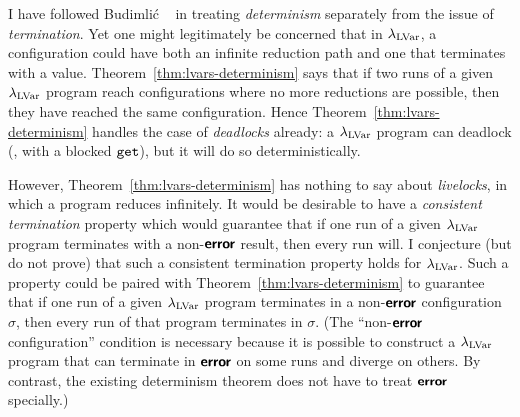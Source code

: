 I have followed Budimli\'c \etal~\cite{CnC} in treating
\emph{determinism} separately from the issue of \emph{termination}.
Yet one might legitimately be concerned that in $\lambda_{\textrm{LVar}}$, a
configuration could have both an infinite reduction path and one that
terminates with a value.  Theorem~\ref{thm:lvars-determinism} says
that if two runs of a given $\lambda_{\textrm{LVar}}$ program reach configurations
where no more reductions are possible, then they have reached the same
configuration.  Hence Theorem~\ref{thm:lvars-determinism} handles the
case of \emph{deadlocks} already: a $\lambda_{\textrm{LVar}}$ program can deadlock
(\eg, with a blocked $\mbox{\texttt{get}}$), but it will do so deterministically.

However, Theorem~\ref{thm:lvars-determinism} has nothing to say about
\emph{livelocks}, in which a program reduces infinitely.  It would be
desirable to have a \emph{consistent termination} property which would
guarantee that if one run of a given $\lambda_{\textrm{LVar}}$ program terminates
with a non-$\textbf{\textsf{error}}$ result, then every run will.  I conjecture (but do
not prove) that such a consistent termination property holds for
$\lambda_{\textrm{LVar}}$.  Such a property could be paired with
Theorem~\ref{thm:lvars-determinism} to guarantee that if one run of a
given $\lambda_{\textrm{LVar}}$ program terminates in a non-$\textbf{\textsf{error}}$ configuration
$\sigma$, then every run of that program terminates in $\sigma$.  (The
``non-$\textbf{\textsf{error}}$ configuration'' condition is necessary because it is
possible to construct a $\lambda_{\textrm{LVar}}$ program that can terminate in
$\textbf{\textsf{error}}$ on some runs and diverge on others.  By contrast, the
existing determinism theorem does not have to treat $\textbf{\textsf{error}}$
specially.)
